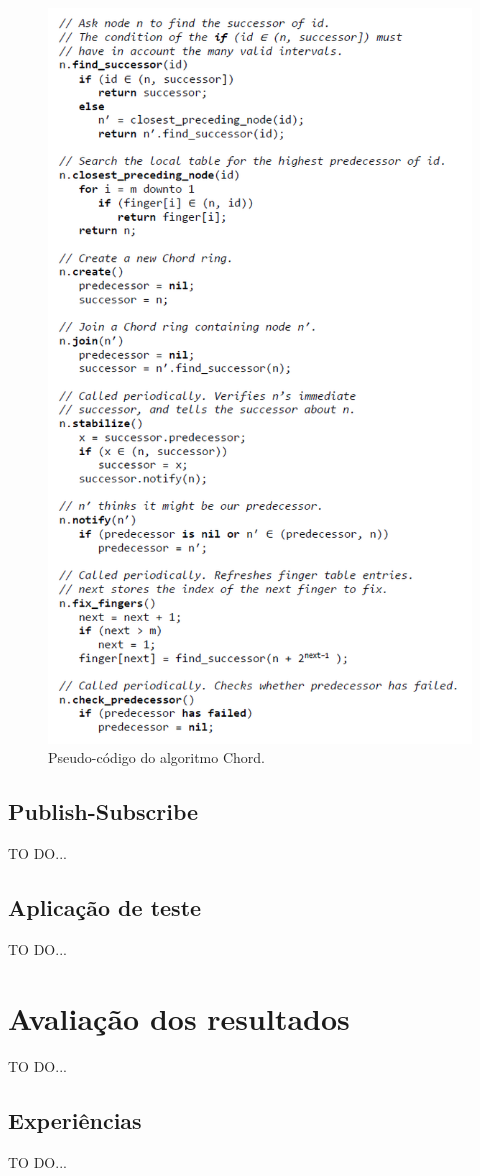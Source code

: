\documentclass[12pt]{article}
\begin{document}
\begin{figure}[htbp]
	\centering
	\includegraphics[height=0.96\textwidth]{pseudoChord.png}
	\caption{Pseudo-código do algoritmo Chord.}
	\label{fig:chord}
\end{figure}

\newpage
\subsection{Publish-Subscribe}

TO DO...

\newpage
\subsection{Aplicação de teste}

TO DO...

\newpage
\section{Avaliação dos resultados}

TO DO...

\subsection{Experiências}

TO DO...
\end{document}
